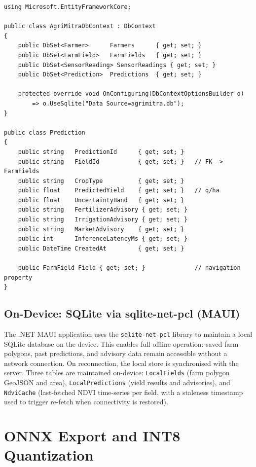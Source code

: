 \begin{lstlisting}[language={[Sharp]C}, caption={Entity Framework Core DbContext and Predictions entity (server-side).}]
using Microsoft.EntityFrameworkCore;

public class AgriMitraDbContext : DbContext
{
    public DbSet<Farmer>      Farmers      { get; set; }
    public DbSet<FarmField>   FarmFields   { get; set; }
    public DbSet<SensorReading> SensorReadings { get; set; }
    public DbSet<Prediction>  Predictions  { get; set; }

    protected override void OnConfiguring(DbContextOptionsBuilder o)
        => o.UseSqlite("Data Source=agrimitra.db");
}

public class Prediction
{
    public string   PredictionId      { get; set; }
    public string   FieldId           { get; set; }   // FK -> FarmFields
    public string   CropType          { get; set; }
    public float    PredictedYield    { get; set; }   // q/ha
    public float    UncertaintyBand   { get; set; }
    public string   FertilizerAdvisory { get; set; }
    public string   IrrigationAdvisory { get; set; }
    public string   MarketAdvisory    { get; set; }
    public int      InferenceLatencyMs { get; set; }
    public DateTime CreatedAt         { get; set; }

    public FarmField Field { get; set; }              // navigation property
}
\end{lstlisting}

\subsection*{On-Device: SQLite via sqlite-net-pcl (MAUI)}

The .NET MAUI application uses the \texttt{sqlite-net-pcl} library to maintain a local SQLite database on the device. This enables full offline operation: saved farm polygons, past predictions, and advisory data remain accessible without a network connection. On reconnection, the local store is synchronised with the server. Three tables are maintained on-device: \texttt{LocalFields} (farm polygon GeoJSON and area), \texttt{LocalPredictions} (yield results and advisories), and \texttt{NdviCache} (last-fetched NDVI time-series per field, with a staleness timestamp used to trigger re-fetch when connectivity is restored).

\section{ONNX Export and INT8 Quantization}

